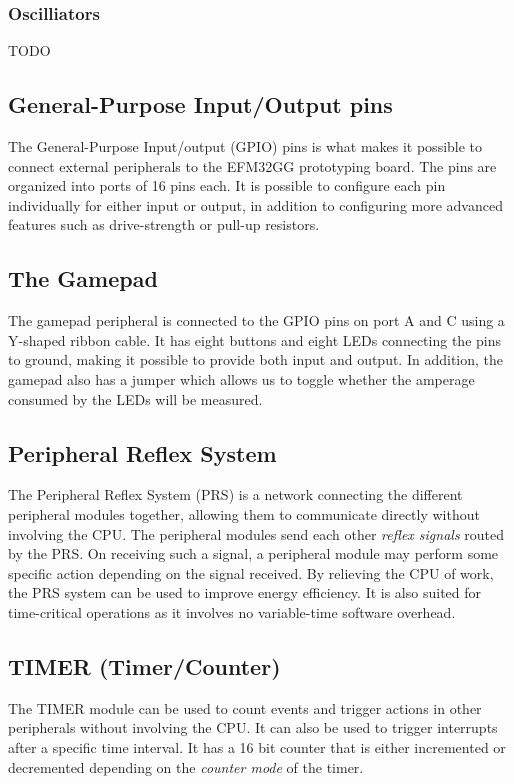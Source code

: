 
\subsubsection{Oscilliators}
TODO %

\subsection{General-Purpose Input/Output pins}
The General-Purpose Input/output (GPIO) pins is what makes it possible to connect external peripherals to the EFM32GG prototyping board. The pins are organized into ports of 16 pins each. It is possible to configure each pin individually for either input or output, in addition to configuring more advanced features such as drive-strength or pull-up resistors.


\subsection{The Gamepad}
The gamepad peripheral is connected to the GPIO pins on port A and C using a Y-shaped ribbon cable. It has eight buttons and eight LEDs connecting the pins to ground, making it possible to provide both input and output. In addition, the gamepad also has a jumper which allows us to toggle whether the amperage consumed by the LEDs will be measured.


\subsection{Peripheral Reflex System}
The Peripheral Reflex System (PRS) is a network connecting the different peripheral modules together, allowing them to communicate directly without involving the CPU. The peripheral modules send each other \emph{reflex signals} routed by the PRS. On receiving such a signal, a peripheral module may perform some specific action depending on the signal received. By relieving the CPU of work, the PRS system can be used to improve energy efficiency. It is also suited for time-critical operations as it involves no variable-time software overhead.


\subsection{TIMER (Timer/Counter)}
The TIMER module can be used to count events and trigger actions in other peripherals without involving the CPU. It can also be used to trigger interrupts after a specific time interval. It has a 16 bit counter that is either incremented or decremented depending on the \emph{counter mode} of the timer.

